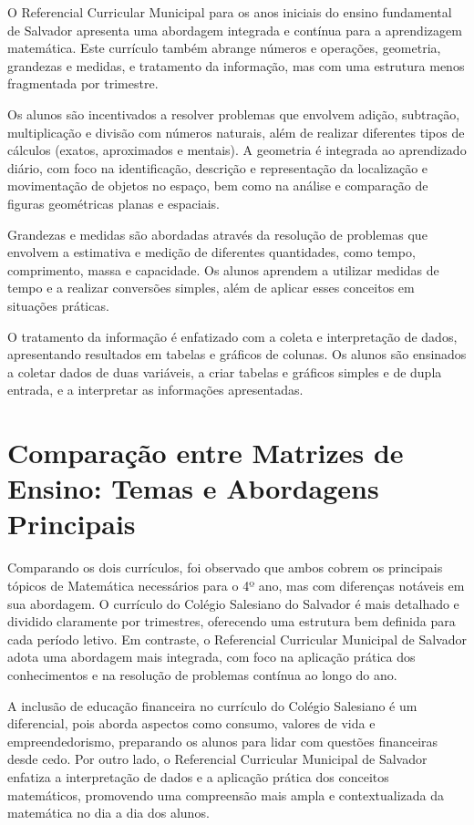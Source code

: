 O Referencial Curricular Municipal para os anos iniciais do ensino fundamental de Salvador apresenta uma abordagem integrada e contínua para a aprendizagem matemática. Este currículo também abrange números e operações, geometria, grandezas e medidas, e tratamento da informação, mas com uma estrutura menos fragmentada por trimestre.

Os alunos são incentivados a resolver problemas que envolvem adição, subtração, multiplicação e divisão com números naturais, além de realizar diferentes tipos de cálculos (exatos, aproximados e mentais). A geometria é integrada ao aprendizado diário, com foco na identificação, descrição e representação da localização e movimentação de objetos no espaço, bem como na análise e comparação de figuras geométricas planas e espaciais.

Grandezas e medidas são abordadas através da resolução de problemas que envolvem a estimativa e medição de diferentes quantidades, como tempo, comprimento, massa e capacidade. Os alunos aprendem a utilizar medidas de tempo e a realizar conversões simples, além de aplicar esses conceitos em situações práticas.

O tratamento da informação é enfatizado com a coleta e interpretação de dados, apresentando resultados em tabelas e gráficos de colunas. Os alunos são ensinados a coletar dados de duas variáveis, a criar tabelas e gráficos simples e de dupla entrada, e a interpretar as informações apresentadas. 
\cite{referencial_curricular_municipal}


\section{Comparação entre Matrizes de Ensino: Temas e Abordagens Principais}

Comparando os dois currículos, foi observado que ambos cobrem os principais tópicos de Matemática necessários para o 4º ano, mas com diferenças notáveis em sua abordagem. O currículo do Colégio Salesiano do Salvador é mais detalhado e dividido claramente por trimestres, oferecendo uma estrutura bem definida para cada período letivo. Em contraste, o Referencial Curricular Municipal de Salvador adota uma abordagem mais integrada, com foco na aplicação prática dos conhecimentos e na resolução de problemas contínua ao longo do ano.

A inclusão de educação financeira no currículo do Colégio Salesiano é um diferencial, pois aborda aspectos como consumo, valores de vida e empreendedorismo, preparando os alunos para lidar com questões financeiras desde cedo. Por outro lado, o Referencial Curricular Municipal de Salvador enfatiza a interpretação de dados e a aplicação prática dos conceitos matemáticos, promovendo uma compreensão mais ampla e contextualizada da matemática no dia a dia dos alunos.

